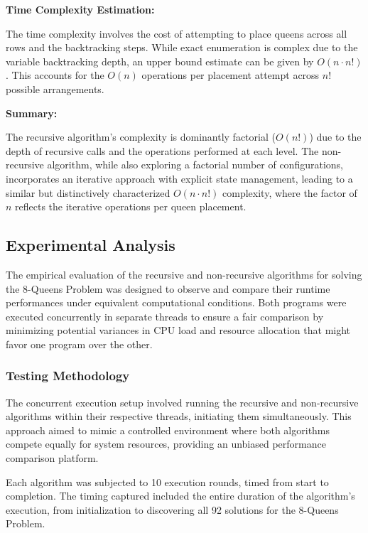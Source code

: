 \documentclass{article}
\begin{document}
\textbf{Time Complexity Estimation:}

The time complexity involves the cost of attempting to place queens across all rows and the backtracking steps. While exact enumeration is complex due to the variable backtracking depth, an upper bound estimate can be given by $O(n \cdot n!)$. This accounts for the $O(n)$ operations per placement attempt across $n!$ possible arrangements.

\textbf{Summary:}

The recursive algorithm's complexity is dominantly factorial ($O(n!)$) due to the depth of recursive calls and the operations performed at each level. The non-recursive algorithm, while also exploring a factorial number of configurations, incorporates an iterative approach with explicit state management, leading to a similar but distinctively characterized $O(n \cdot n!)$ complexity, where the factor of $n$ reflects the iterative operations per queen placement.

\subsection*{Experimental Analysis}

The empirical evaluation of the recursive and non-recursive algorithms for solving the 8-Queens Problem was designed to observe and compare their runtime performances under equivalent computational conditions. Both programs were executed concurrently in separate threads to ensure a fair comparison by minimizing potential variances in CPU load and resource allocation that might favor one program over the other.

\subsubsection*{Testing Methodology}

The concurrent execution setup involved running the recursive and non-recursive algorithms within their respective threads, initiating them simultaneously. This approach aimed to mimic a controlled environment where both algorithms compete equally for system resources, providing an unbiased performance comparison platform.

Each algorithm was subjected to 10 execution rounds, timed from start to completion. The timing captured included the entire duration of the algorithm's execution, from initialization to discovering all 92 solutions for the 8-Queens Problem.
\end{document}
